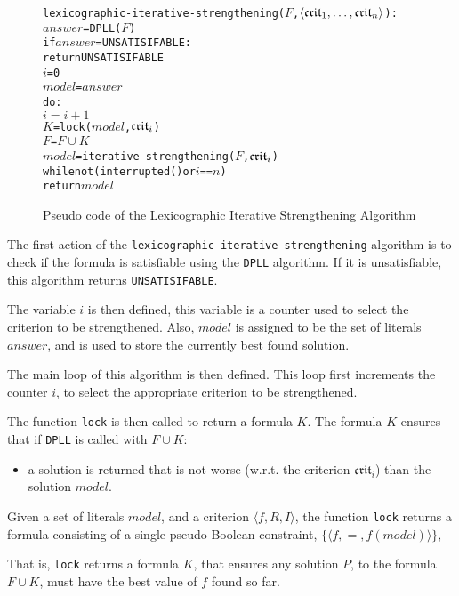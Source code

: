 \begin{figure}[htp]
\begin{center}
\begin{alltt}
lexicographic-iterative-strengthening(\(F\),\(\langle{}\mathfrak{crit}\sb{1}, \ldots ,\mathfrak{crit}\sb{n}\rangle\)):  
    \(answer\) = DPLL(\(F\))
    if \(answer\) = UNSATISIFABLE:
        return UNSATISIFABLE
    \(i\) = 0
    \(model\) = \(answer\)
    do:
        \(i = i + 1\)
        \(K\) = lock(\(model\),\(\mathfrak{crit}\sb{i}\))
        \(F\) = \(F \cup K\)
        \(model\) = iterative-strengthening(\(F\),\(\mathfrak{crit}\sb{i}\))
    while not (interrupted() or \(i\) == \(n\))
    return \(model\) 
\end{alltt}
  \caption{Pseudo code of the Lexicographic Iterative Strengthening Algorithm}
  \label{impl.lexstrength}
\end{center}
\end{figure}

The first action of the \texttt{lexicographic-iterative-strengthening} algorithm is to check if the formula is satisfiable using the \texttt{DPLL} algorithm.
If it is unsatisfiable, this algorithm returns \texttt{UNSATISIFABLE}.

The variable $i$ is then defined, this variable is a counter used to select the criterion to be strengthened.
Also, $model$ is assigned to be the set of literals $answer$, and is used to store the currently best found solution.

The main loop of this algorithm is then defined.
This loop first increments the counter $i$, to select the appropriate criterion to be strengthened.

The function \texttt{lock} is then called to return a formula $K$.
The formula $K$ ensures that if \texttt{DPLL} is called with $F \cup K$:
\begin{itemize}
  \item a solution is returned that is not worse (w.r.t. the criterion $\mathfrak{crit}_i$) than the solution $model$. 
\end{itemize}

\begin{defs}
Given a set of literals $model$, and a criterion $\langle f, R, I \rangle$,
the function \texttt{lock} returns a formula consisting of a single pseudo-Boolean constraint, $\{ \langle f,=,f(model) \rangle \}$,
\end{defs}
That is, \texttt{lock} returns a formula $K$,
that ensures any solution $P$, to the formula $F \cup K$, must have the best value of $f$ found so far.

